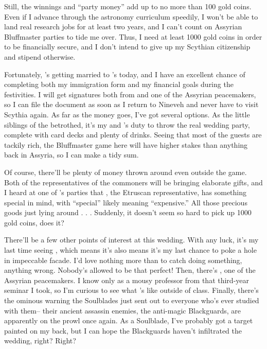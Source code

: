\documentclass[char]{Kos}
\begin{document}
Still, the winnings and ``party money'' add up to no more than 100 gold coins. Even if I advance through the astronomy curriculum speedily, I won't be able to land real research jobs for at least two years, and I can't count on Assyrian Bluffmaster parties to tide me over. Thus, I need at least 1000 gold coins in order to be financially secure, and I don't intend to give up my Scythian citizenship and stipend otherwise.

Fortunately, \cBride{}'s getting married to \cPoet{}'s \cGroom{\sibling} \cGroom{} today, and I have an excellent chance of completing both my immigration form and my financial goals during the festivities. I will get signatures both from \cScythiaKing{} and one of the Assyrian peacemakers, so I can file the document as soon as I return to Nineveh and never have to visit Scythia again. As far as the money goes, I've got several options. As the little siblings of the betrothed, it's my and \cPoet{}'s duty to throw the real wedding party, complete with card decks and plenty of drinks. Seeing that most of the guests are tackily rich, the Bluffmaster game here will have higher stakes than anything back in Assyria, so I can make a tidy sum.

Of course, there'll be plenty of money thrown around even outside the game. Both of the representatives of the commoners will be bringing elaborate gifts, and I heard at one of \cPoet{}'s parties that \cMerchant{}, the Etruscan representative, has something special in mind, with ``special'' likely meaning ``expensive.'' All those precious goods just lying around . . . Suddenly, it doesn't seem so hard to pick up 1000 gold coins, does it?

There'll be a few other points of interest at this wedding. With any luck, it's my last time seeing \cBride{}, which means it's also means it's my last chance to poke a hole in \cBride{\their} impeccable facade. I'd love nothing more than to catch \cBride{\them} doing something, anything wrong. Nobody's allowed to be that perfect! Then, there's \cAnarchist{}, one of the Assyrian peacemakers. I know \cAnarchist{} only as a mousy professor from that third-year seminar I took, so I'm curious to see what \cAnarchist{\they}'s like outside of class. Finally, there's the ominous warning the Soulblades just sent out to everyone who's ever studied with them-- their ancient assassin enemies, the anti-magic Blackguards, are apparently on the prowl once again. As a Soulblade, I've probably got a target painted on my back, but I can hope the Blackguards haven't infiltrated the wedding, right? Right?
\end{document}
